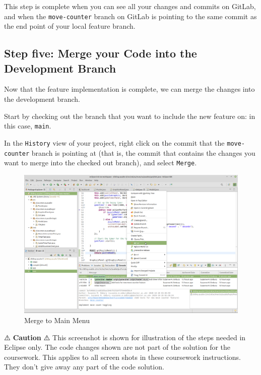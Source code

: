 \documentclass[
]{book}
\begin{document}
This step is complete when you can see all your changes and commits on GitLab, and when the \texttt{move-counter} branch on GitLab is pointing to the same commit as the end point of your local feature branch.

\hypertarget{mergedev}{%
\subsection{Step five: Merge your Code into the Development Branch}\label{mergedev}}

Now that the feature implementation is complete, we can merge the changes into the development branch.

Start by checking out the branch that you want to include the new feature on: in this case, \texttt{main}.

In the \texttt{History} view of your project, right click on the commit that the \texttt{move-counter} branch is pointing at (that is, the commit that contains the changes you want to merge into the checked out branch), and select \texttt{Merge}.

\begin{figure}

{\centering \includegraphics[width=1\linewidth]{images/mergeFBtoMasterMenu} 

}

\caption{Merge to Main Menu}\label{fig:mergeFBtoMasterMenu-fig}
\end{figure}

⚠️ \textbf{Caution} ⚠️
This screenshot is shown for illustration of the steps needed in Eclipse only. The code changes shown are not part of the solution for the coursework. This applies to all screen shots in these coursework instructions. They don't give away any part of the code solution.
\end{document}
